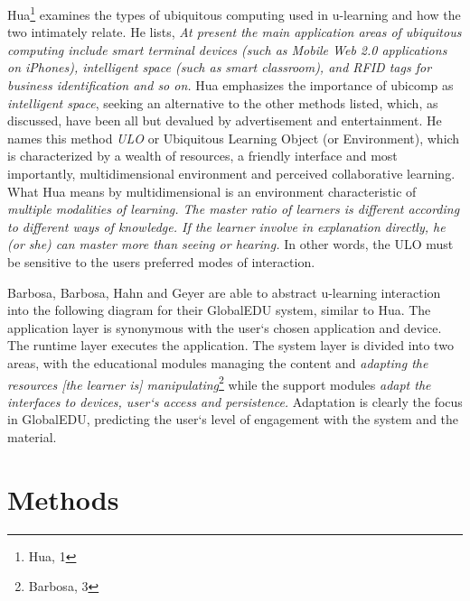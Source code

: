 \documentclass[twoside]{article}
\begin{document}
\begin{multicols}{2}
\setlength\parindent{24pt}Hua\footnote{Hua, 1} examines the types of ubiquitous computing used in u-learning and how the two intimately relate. He lists, \emph{At present the main application areas of ubiquitous computing include smart terminal devices (such as Mobile Web 2.0 applications on iPhones), intelligent space (such as smart classroom), and RFID tags for business identification and so on.} Hua emphasizes the importance of ubicomp as \emph{intelligent space}, seeking an alternative to the other methods listed, which, as discussed, have been all but devalued by advertisement and entertainment. He names this method \emph{ULO} or Ubiquitous Learning Object (or Environment), which is characterized by a wealth of resources, a friendly interface and most importantly, multidimensional environment and {perceived collaborative learning}. What Hua means by multidimensional is an environment characteristic of \emph{multiple modalities of learning. The master ratio of learners is different according to different ways of knowledge. If the learner involve in explanation directly, he (or she) can master more than seeing or hearing.} In other words, the ULO must be sensitive to the users preferred modes of interaction.

\setlength\parindent{24pt}Barbosa, Barbosa, Hahn and Geyer are able to abstract u-learning interaction into the following diagram for their GlobalEDU system, similar to Hua. The application layer is synonymous with the user`s chosen application and device. The runtime layer executes the application. The system layer is divided into two areas, with the educational modules managing the content and \emph{adapting the resources [the learner is] manipulating}\footnote{Barbosa, 3} while the support modules \emph{adapt the interfaces to devices, user`s access and persistence.} Adaptation is clearly the focus in GlobalEDU, predicting the user`s level of engagement with the system and the material.



\section{Methods}


\end{multicols}
\end{document}
